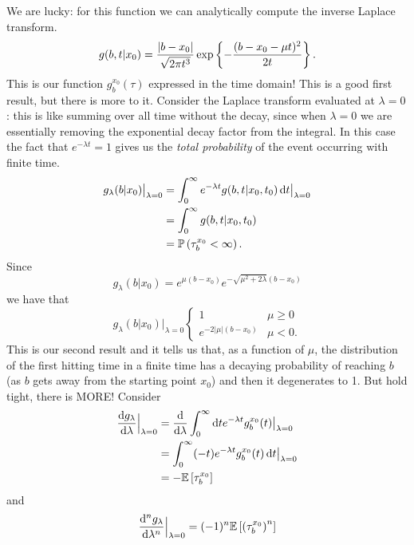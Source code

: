 \documentclass[12pt]{report}
\begin{document}
We are lucky: for this function we can analytically compute the inverse Laplace transform.
\begin{equation*}
	g(b,t|x_{0})=\frac{|b-x_{0}|}{\sqrt{2\pi t^{3}}}\exp\left\{-\frac{(b-x_{0}-\mu t)^{2}}{2t}\right\}.
\end{equation*}
This is our function $g_{b}^{x_{0}}(\tau)$ expressed in the time domain! This is a good first result, but there is more to it. Consider the Laplace transform evaluated at $\lambda=0$: this is like summing over all time without the decay, since when $\lambda=0$ we are essentially removing the exponential decay factor from the integral. In this case the fact that $e^{-\lambda t}=1$ gives us the \textit{total probability} of the event occurring with finite time.
\begin{align*}
	g_{\lambda}(b|x_{0})\big|_{\lambda=0}&=\int_{0}^{\infty}e^{-\lambda t}g(b,t|x_{0},t_{0})\mathop{}\!\mathrm{d} t\big|_{\lambda=0}\\
	&=\int_{0}^{\infty}g(b,t|x_{0},t_{0})\\
	&=\mathbb{P}\left(\tau_{b}^{x_{0}}<\infty\right).
\end{align*}
Since 
\begin{equation*}
	g_{\lambda}(b|x_{0})=e^{\mu(b-x_{0})}e^{-\sqrt{\mu^{2}+2\lambda}(b-x_{0})}
\end{equation*}
we have that
\begin{equation*}
		g_{\lambda}(b|x_{0})\big|_{\lambda=0}\begin{cases}
			1&\mu\geq0\\
			e^{-2|\mu|(b-x_{0})}&\mu<0.
		\end{cases}
\end{equation*}
This is our second result and it tells us that, as a function of $\mu$, the distribution of the first hitting time in a finite time has a decaying probability of reaching $b$ (as $b$ gets away from the starting point $x_{0}$) and then it degenerates to 1. But hold tight, there is MORE! Consider
\begin{align*}
	\frac{\mathop{}\!\mathrm{d} g_{\lambda}}{\mathop{}\!\mathrm{d}\lambda}\Big|_{\lambda=0}&=\frac{\mathop{}\!\mathrm{d}}{\mathop{}\!\mathrm{d}\lambda}\int_{0}^{\infty}\mathop{}\!\mathrm{d} te^{-\lambda t}g_{b}^{x_{0}}(t)\big|_{\lambda=0}\\
	&=\int_{0}^{\infty}(-t)e^{-\lambda t}g_{b}^{x_{0}}(t)\mathop{}\!\mathrm{d} t\big|_{\lambda=0}\\
	&=-\mathbb{E}\left[\tau^{x_{0}}_{b}\right]
\end{align*}
and
\begin{equation*}
	\frac{\mathop{}\!\mathrm{d}^{n} g_{\lambda}}{\mathop{}\!\mathrm{d}\lambda^{n}}\Big|_{\lambda=0}=(-1)^{n}\mathbb{E}\left[\left(\tau_{b}^{x_{0}}\right)^{n}\right]
\end{equation*}
\end{document}
